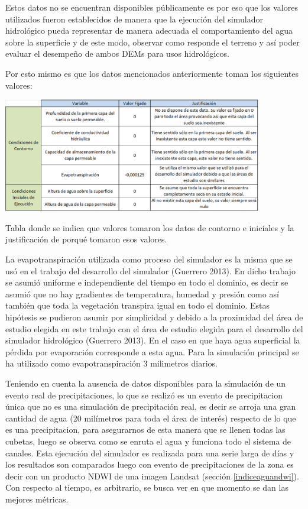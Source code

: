 \documentclass[10pt,a4paper, twoside]{report}
\begin{document}
Estos datos no se encuentran disponibles públicamente es por eso que los valores utilizados fueron establecidos de manera que la ejecución del simulador hidrológico pueda representar de manera adecuada el comportamiento del agua sobre la superficie y de este modo, observar como responde el terreno y así poder evaluar el desempeño de ambos DEMs para usos hidrológicos.

Por esto mismo es que los datos mencionados anteriormente toman los siguientes valores:


\begin{table}[H]
   \centering      
   \includegraphics[width=0.85\textwidth]{imagenes/DatosContorno.jpg}
 \caption{Tabla donde se indica que valores tomaron los datos de contorno e iniciales y la justificación de porqué tomaron esos valores.}
 \label{datoscontorno}
\end{table}

La evapotranspiración utilizada como proceso del simulador es la misma que se usó en el trabajo del desarrollo del simulador (Guerrero 2013). En dicho trabajo se asumió uniforme e independiente del tiempo en todo el dominio, es decir se asumió que no hay gradientes de temperatura, humedad y presión como así también que toda la vegetación transpira igual en todo el dominio. Estas hipótesis se pudieron asumir por simplicidad y debido a la proximidad del área de estudio elegida en este trabajo con el área de estudio elegida para el desarrollo del simulador hidrológico (Guerrero 2013). En el caso en que haya agua superficial la pérdida por evaporación corresponde a esta agua. Para la simulación principal se ha utilizado como evapotranspiración 3 milimetros diarios.

Teniendo en cuenta la ausencia de datos disponibles para la simulación de un evento real de precipitaciones, lo que se realizó es un evento de precipitacion única que no es una simulación de precipitación real, es decir se arroja una gran cantidad de agua (20 milímetros para toda el área de interés) respecto de lo que es una precipitacion, para asegurarnos de esta manera que se llenen todas las cubetas, luego se observa como se enruta el agua y funciona todo el sistema de canales. Esta ejecución del simulador es realizada para una serie larga de días y los resultados son comparados luego con evento de precipitaciones de la zona es decir con un producto NDWI de una imagen Landsat (sección \ref{indiceaguandwi}). Con respecto al tiempo, es arbitrario, se busca ver en que momento se dan las mejores métricas.
\end{document}

